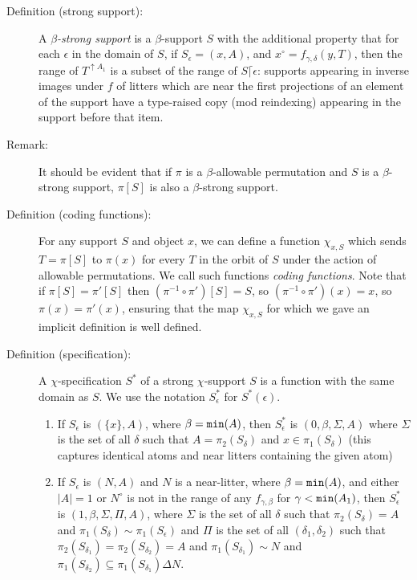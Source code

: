 \documentclass[112pt]{article}
\begin{document}
\begin{description}

\item[Definition (strong support):]  A {\em $\beta$-strong support\/} is a $\beta$-support $S$ with the additional property that  for each $\epsilon$ in the domain of $S$, if $S_\epsilon = (x,A)$, and $x^\circ = f_{\gamma,\delta}(y,T)$, then the range of $T^{\uparrow A_1}$ is a subset of the range of $S \lceil \epsilon$:  supports appearing in inverse images under $f$ of litters which are near the first projections of an element of the support have a type-raised copy (mod reindexing) appearing in the support before that item.



\item[Remark:]  It should be evident that if $\pi$ is a $\beta$-allowable permutation and $S$ is a $\beta$-strong support,
$\pi[S]$ is also a $\beta$-strong support.

\item[Definition (coding functions):]  For any support $S$ and object $x$, we can define a function $\chi_{x,S}$ which sends $T=\pi[S]$ to $\pi(x)$ for every $T$ in the orbit of $S$ under
the action of allowable permutations.  We call such functions {\em coding functions\/}.  Note that if $\pi[S]=\pi'[S]$ then $(\pi^{-1}\circ \pi')[S]= S$, so 
$(\pi^{-1}\circ \pi')(x)= x$, so $\pi(x)=\pi'(x)$, ensuring that the map $\chi_{x,S}$ for which we gave an implicit definition is well defined.

\item[Definition (specification):]  A $\chi$-specification $S^*$ of a strong $\chi$-support $S$ is a function with the same domain as $S$.  We use the notation $S^*_\epsilon$ for $S^*(\epsilon)$.

\begin{enumerate}

\item  If $S_{\epsilon}$ is $(\{x\},A)$, where $\beta={\tt min}(A)$, then $S^*_\epsilon$ is $(0,\beta,\Sigma,A)$ where  $\Sigma$ is the set of all $\delta$ such that $A=\pi_2(S_\delta)$ and $x \in  \pi_1(S_\delta)$ (this captures identical atoms and near litters containing the given atom)

\item  If $S_\epsilon$ is $(N,A)$ and $N$ is a near-litter, where $\beta={\tt min}(A)$, and either $|A|=1$ or $N^\circ$ is not in the range of any $f_{\gamma,\beta}$ for $\gamma<{\tt min}(A_1)$, then $S^*_\epsilon$ is $(1,\beta,\Sigma,\Pi,A)$, where $\Sigma$ is the set of all $\delta$ such that $\pi_2(S_\delta) = A$
and $\pi_1(S_\delta) \sim \pi_1(S_\epsilon)$ and
$\Pi$ is the set of all $(\delta_1,\delta_2)$ such that $\pi_2(S_{\delta_1}) = \pi_2(S_{\delta_2}) = A$ and $\pi_1(S_{\delta_1})\sim N$ and $\pi_1(S_{\delta_2}) \subseteq \pi_1(S_{\delta_1}) \Delta N$.


\end{enumerate}
\end{description}
\end{document}
